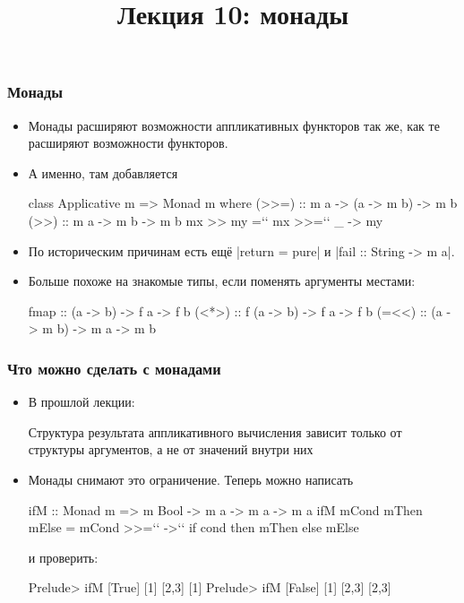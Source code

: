 \documentclass[11pt]{beamer}
\title{Лекция 10: монады}
\begin{document}
\begin{frame}[plain]
    \maketitle
\end{frame}

\begin{frame}[fragile]
\frametitle{Монады}
\begin{itemize}
    \item Монады расширяют возможности аппликативных функторов так же, как те расширяют возможности функторов.
    \item А именно, там добавляется
    \begin{haskell}
    class Applicative m => Monad m where
      (>>=) :: m a -> (a -> m b) -> m b
      (>>) :: m a -> m b -> m b
      mx >> my =`\pause` mx >>=`\pause` \_ -> my
    \end{haskell}
    \pause
    \item По историческим причинам есть ещё \haskinline|return = pure| и \haskinline|fail :: String -> m a|.
    \pause
    \item Больше похоже на знакомые типы, если поменять аргументы местами:
    \begin{haskell}
    fmap  ::   (a -> b) -> f a -> f b
    (<*>) :: f (a -> b) -> f a -> f b
    (=<<) :: (a -> m b) -> m a -> m b
    \end{haskell}
\end{itemize}
\end{frame}

\begin{frame}[fragile]
\frametitle{Что можно сделать с монадами}
\begin{itemize}
    \item В прошлой лекции: 
    \begin{displayquote}
        Структура результата аппликативного вычисления зависит только от структуры аргументов, а не от значений внутри них
    \end{displayquote}
    \item Монады снимают это ограничение. Теперь можно написать 
    \begin{haskell}
    ifM :: Monad m => m Bool -> m a -> m a -> m a
    ifM mCond mThen mElse = mCond >>=`\pause` \cond ->`\pause` 
      if cond then mThen else mElse
    \end{haskell}
    и проверить:
    \begin{haskell}
    Prelude> ifM [True] [1] [2,3]
    [1]
    Prelude> ifM [False] [1] [2,3]
    [2,3]
    \end{haskell}
\end{itemize}
\end{frame}
\end{document}
